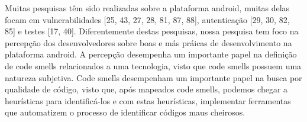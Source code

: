 Muitas pesquisas t\^em sido realizadas sobre a plataforma android, muitas delas focam em vulnerabilidades [25, 43, 27, 28, 81, 87, 88], autentica\c{c}\~ao [29, 30, 82, 85] e testes [17, 40]. Diferentemente destas pesquisas, nossa pesquisa tem foco na percep\c{c}\~ao dos desenvolvedores sobre boas e m\'as pr\'aicas de desenvolvimento na plataforma android. A percep\c{c}\~ao desempenha um importante papel na defini\c{c}\~ao de code smells relacionados a uma tecnologia, visto que code smells possuem uma natureza subjetiva. Code smells desempenham um importante papel na busca por qualidade de c\'odigo, visto que, ap\'os mapeados code smells, podemos chegar a heur\'isticas para identific\'a-los e com estas heur\'isticas, implementar ferramentas que automatizem o processo de identificar c\'odigos maus cheirosos.